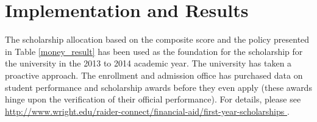 \documentclass[12pt,english]{report}
\begin{document}

\section{Implementation and Results}
The scholarship allocation based on the composite score and the policy
presented in
Table \ref{money_result} has been used as the foundation for the scholarship
for the
university in the 2013 to 2014 academic year.  The university has taken a
proactive
approach. The enrollment and admission office has purchased data on student
performance
and scholarship awards before they even apply (these awards hinge upon the
verification
of their official performance). For details, please see
\url{http://www.wright.edu/raider-connect/financial-aid/first-year-scholarships
}.
\end{document}
